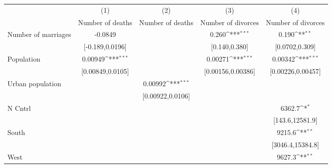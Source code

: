 {
\def\sym#1{\ifmmode^{#1}\else\(^{#1}\)\fi}
\begin{tabular}{l*{4}{c}}
\hline\hline
                    &\multicolumn{1}{c}{(1)}        &\multicolumn{1}{c}{(2)}        &\multicolumn{1}{c}{(3)}        &\multicolumn{1}{c}{(4)}        \\
                    &\multicolumn{1}{c}{Number of deaths}&\multicolumn{1}{c}{Number of deaths}&\multicolumn{1}{c}{Number of divorces}&\multicolumn{1}{c}{Number of divorces}\\
\hline
Number of marriages &               -0.0849         &                               &                 0.260\sym{***}&                 0.190\sym{**} \\
                    &       [-0.189,0.0196]         &                               &         [0.140,0.380]         &        [0.0702,0.309]         \\
[1em]
Population          &               0.00949\sym{***}&                               &               0.00271\sym{***}&               0.00342\sym{***}\\
                    &      [0.00849,0.0105]         &                               &     [0.00156,0.00386]         &     [0.00226,0.00457]         \\
[1em]
Urban population    &                               &               0.00992\sym{***}&                               &                               \\
                    &                               &      [0.00922,0.0106]         &                               &                               \\
[1em]
N Cntrl             &                               &                               &                               &                6362.7\sym{*}  \\
                    &                               &                               &                               &       [143.6,12581.9]         \\
[1em]
South               &                               &                               &                               &                9215.6\sym{**} \\
                    &                               &                               &                               &      [3046.4,15384.8]         \\
[1em]
West                &                               &                               &                               &                9627.3\sym{**} \\

\end{tabular}}
